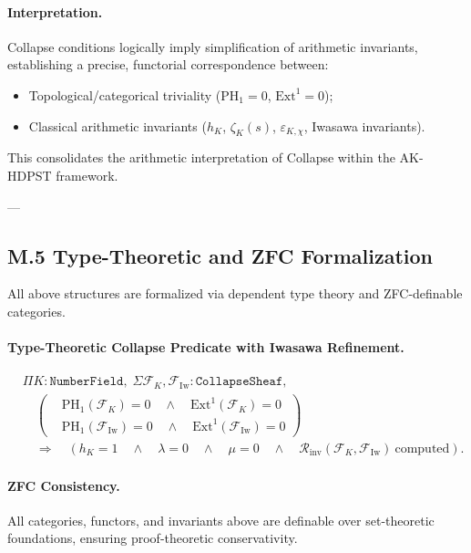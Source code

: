 \documentclass[11pt]{article}
\begin{document}
\paragraph{Interpretation.}
Collapse conditions logically imply simplification of arithmetic invariants, establishing a precise, functorial correspondence between:

\begin{itemize}
    \item Topological/categorical triviality (\( \mathrm{PH}_1 = 0 \), \( \mathrm{Ext}^1 = 0 \));
    \item Classical arithmetic invariants (\( h_K \), \( \zeta_K(s) \), \( \varepsilon_{K,\chi} \), Iwasawa invariants).
\end{itemize}

This consolidates the arithmetic interpretation of Collapse within the AK-HDPST framework.

---

\subsection*{M.5 Type-Theoretic and ZFC Formalization}

All above structures are formalized via dependent type theory and ZFC-definable categories.

\paragraph{Type-Theoretic Collapse Predicate with Iwasawa Refinement.}
\[
\begin{aligned}
&\Pi K : \texttt{NumberField},\; 
\Sigma \mathcal{F}_K, \mathcal{F}_{\mathrm{Iw}} : \texttt{CollapseSheaf}, \\
&\quad
\left(
\begin{aligned}
& \mathrm{PH}_1(\mathcal{F}_K) = 0 \quad \wedge \quad \mathrm{Ext}^1(\mathcal{F}_K) = 0 \\
& \mathrm{PH}_1(\mathcal{F}_{\mathrm{Iw}}) = 0 \quad \wedge \quad \mathrm{Ext}^1(\mathcal{F}_{\mathrm{Iw}}) = 0
\end{aligned}
\right)
\\
&\quad \Rightarrow\quad
\left(
h_K = 1 \quad \wedge \quad
\lambda = 0 \quad \wedge \quad
\mu = 0 \quad \wedge \quad
\mathcal{R}_{\mathrm{inv}}(\mathcal{F}_K,\mathcal{F}_{\mathrm{Iw}})\ \text{computed}
\right).
\end{aligned}
\]


\paragraph{ZFC Consistency.}
All categories, functors, and invariants above are definable over set-theoretic foundations, ensuring proof-theoretic conservativity.
\end{document}
